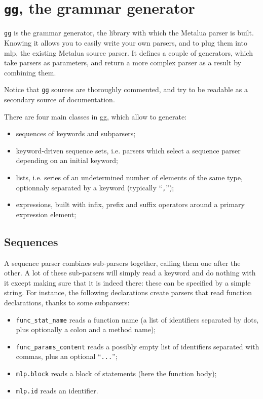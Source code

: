 \section{{\tt gg}, the grammar generator}

\verb|gg| is the grammar generator, the library with which the Metalua
parser is built. Knowing it allows you to easily write your own
parsers, and to plug them into mlp, the existing Metalua source
parser. It defines a couple of generators, which take parsers as
parameters, and return a more complex parser as a result by combining
them.

Notice that \verb|gg| sources are thoroughly commented, and try to be
readable as a secondary source of documentation.

There are four main classes in gg, which allow to generate:
\begin{itemize}
\item sequences of keywords and subparsers;
\item keyword-driven sequence sets, i.e. parsers which select a
  sequence parser depending on an initial keyword;
\item lists, i.e. series of an undetermined number of elements of the
  same type, optionnaly separated by a keyword (typically ``{\tt,}'');
\item expressions, built with infix, prefix and suffix operators
  around a primary expression element;
\end{itemize}



\subsection{Sequences}

A sequence parser combines sub-parsers together, calling them one after
the other. A lot of these sub-parsers will simply read a keyword and
do nothing with it except making sure that it is indeed there: these can
be specified by a simple string. For instance, the following
declarations create parsers that read function declarations, thanks
to some subparsers:
\begin{itemize}
\item \verb|func_stat_name| reads a function name (a list of
  identifiers separated by dots, plus optionally a colon and a
  method name);
\item \verb|func_params_content| reads a possibly empty list of
  identifiers separated with commas, plus an optional ``\verb|...|'';
\item \verb|mlp.block| reads a block of statements (here the function
  body);
\item \verb|mlp.id| reads an identifier.
\end{itemize}

